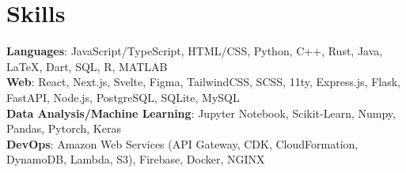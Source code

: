 \documentclass{article}
\newcommand{\resumesection}[3]{
    \subsection*{#1}
    \ 
    \normalsize
    \normalsize
    \hfill
    \textcolor{black}{#3}
    \normalsize
    \newline
    \small
    \textcolor{grey}{\emph{#2}}
}
\begin{document}

\section*{Skills}
\textbf{Languages}: JavaScript/TypeScript, HTML/CSS, Python, C++, Rust, Java, {\selectfont\LaTeX}, Dart, SQL, R, MATLAB\\
\textbf{Web}: React, Next.js, Svelte, Figma, TailwindCSS, SCSS, 11ty, Express.js, Flask, FastAPI, Node.js, PostgreSQL, SQLite, MySQL\\
\textbf{Data Analysis/Machine Learning}: Jupyter Notebook, Scikit-Learn, Numpy, Pandas, Pytorch, Keras\\
\textbf{DevOps}: Amazon Web Services (API Gateway, CDK, CloudFormation, DynamoDB, Lambda, S3), Firebase, Docker, NGINX\\
\end{document}
